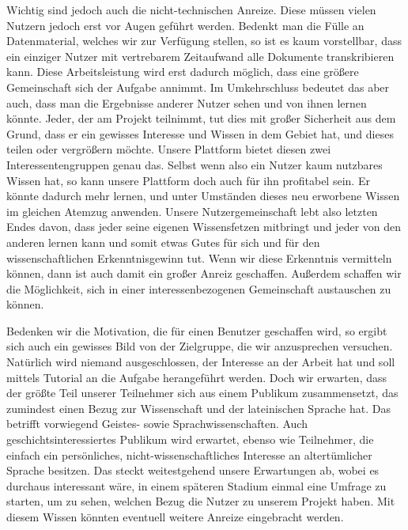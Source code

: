 \documentclass{article}
\begin{document}
Wichtig sind jedoch auch die nicht-technischen Anreize.
Diese müssen vielen Nutzern jedoch erst vor Augen geführt werden.
Bedenkt man die Fülle an Datenmaterial, welches wir zur Verfügung stellen, so ist es kaum vorstellbar,
dass ein einziger Nutzer mit vertrebarem Zeitaufwand alle Dokumente transkribieren kann.
Diese Arbeitsleistung wird erst dadurch möglich, dass eine größere Gemeinschaft sich der Aufgabe annimmt.
Im Umkehrschluss bedeutet das aber auch, dass man die Ergebnisse anderer Nutzer sehen und von ihnen lernen könnte.
Jeder, der am Projekt teilnimmt, tut dies mit großer Sicherheit aus dem Grund,
dass er ein gewisses Interesse und Wissen in dem Gebiet hat, und dieses teilen oder vergrößern möchte.
Unsere Plattform bietet diesen zwei Interessentengruppen genau das.
Selbst wenn also ein Nutzer kaum nutzbares Wissen hat, so kann unsere Plattform doch auch für ihn profitabel sein.
Er könnte dadurch mehr lernen, und unter Umständen dieses neu erworbene Wissen im gleichen Atemzug anwenden.
Unsere Nutzergemeinschaft lebt also letzten Endes davon, dass jeder seine eigenen Wissensfetzen mitbringt
und jeder von den anderen lernen kann und somit etwas Gutes für sich und für den wissenschaftlichen Erkenntnisgewinn tut.%
Wenn wir diese Erkenntnis vermitteln können, dann ist auch damit ein großer Anreiz geschaffen.
Außerdem schaffen wir die Möglichkeit, sich in einer interessenbezogenen Gemeinschaft austauschen zu können.

Bedenken wir die Motivation, die für einen Benutzer geschaffen wird, so ergibt sich auch ein gewisses Bild von der Zielgruppe, die wir anzusprechen versuchen.
Natürlich wird niemand ausgeschlossen, der Interesse an der Arbeit hat und soll mittels Tutorial an die Aufgabe herangeführt werden.
Doch wir erwarten, dass der größte Teil unserer Teilnehmer sich aus einem Publikum zusammensetzt,
das zumindest einen Bezug zur Wissenschaft und der lateinischen Sprache hat.
Das betrifft vorwiegend Geistes- sowie Sprachwissenschaften. Auch geschichtsinteressiertes Publikum wird erwartet,
ebenso wie Teilnehmer, die einfach ein persönliches, nicht-wissenschaftliches Interesse an altertümlicher Sprache besitzen.
Das steckt weitestgehend unsere Erwartungen ab, wobei es durchaus interessant wäre, in einem späteren Stadium einmal eine Umfrage zu starten, um zu sehen,
welchen Bezug die Nutzer zu unserem Projekt haben. Mit diesem Wissen könnten eventuell weitere Anreize eingebracht werden.

\end{document}
